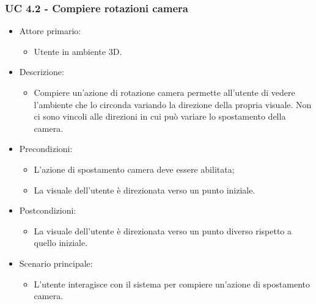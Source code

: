 \subsubsection{UC 4.2 - Compiere rotazioni camera}
\begin{itemize}

	\item Attore primario: 
	\begin{itemize}
		\item Utente in ambiente 3D.
	\end{itemize}
	\item Descrizione:
	\begin{itemize}
		\item Compiere un'azione di rotazione camera permette all'utente di vedere l'ambiente che lo circonda variando
la direzione della propria visuale.
\newline Non ci sono vincoli alle direzioni in cui può variare lo spostamento della camera.
	\end{itemize}
	
	\item Precondizioni:
	\begin{itemize}
		\item L'azione di spostamento camera deve essere abilitata;
		\item La visuale dell'utente è direzionata verso un punto iniziale.
	\end{itemize}
	
	\item Postcondizioni:
	\begin{itemize}
		\item La visuale dell'utente è direzionata verso un punto diverso rispetto a quello iniziale.
	\end{itemize}
	
	\item Scenario principale:
	\begin{itemize}
		\item L'utente interagisce con il sistema per compiere un'azione di spostamento camera.
	\end{itemize}
	
\end{itemize}

\pagebreak

